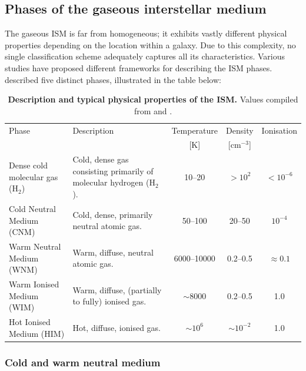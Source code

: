 \subsection{Phases of the gaseous interstellar medium}

The gaseous ISM is far from homogeneous; it exhibits vastly different physical properties depending on the location within a galaxy. Due to this complexity, no single classification scheme adequately captures all its characteristics. Various studies have proposed different frameworks for describing the ISM phases. \citet{Klessen2016} described five distinct phases, illustrated in the table below:

\begin{table}[htbp]
    \centering
    \caption{\textbf{Description and typical physical properties of the ISM.} Values compiled from \citet{Klessen2016} and \citet{Ferriere_2001}.}
    \label{tab:ISMcomponents}
    \small
    \setlength{\tabcolsep}{6pt}
    \renewcommand{\arraystretch}{1.15}

    \begin{tabularx}{\linewidth}{L{3.2cm} L{6.3cm} c c c}
        \toprule
Phase & Description & Temperature & Density & Ionisation \\
              & & [K] & [cm$^{-3}$] & \\
        \midrule
Dense cold molecular gas (H$_2$) &
Cold, dense gas consisting primarily of molecular hydrogen (H$_2$). &
        10--20 & $>10^{2}$ & $<10^{-6}$ \\

Cold Neutral Medium (CNM) &
Cold, dense, primarily neutral atomic gas. &
        50--100 & 20--50 & $10^{-4}$ \\

Warm Neutral Medium (WNM) &
Warm, diffuse, neutral atomic gas. &
        6000--10000 & 0.2--0.5 & $\approx 0.1$ \\

Warm Ionised Medium (WIM) &
Warm, diffuse, (partially to fully) ionised gas. &
        $\sim 8000$ & 0.2--0.5 & 1.0 \\

Hot Ionised Medium (HIM) &
Hot, diffuse, ionised gas. &
        $\sim 10^{6}$ & $\sim 10^{-2}$ & 1.0 \\
        \bottomrule
    \end{tabularx}
\end{table}


\subsubsection{Cold and warm neutral medium}


